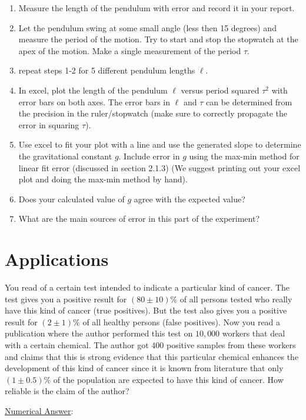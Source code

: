 \begin{itemize}
\begin{enumerate}
\item Measure the length of the pendulum with error and record it in your report.
\item Let the pendulum swing at some small angle (less then 15 degrees) and measure the period of the motion. Try to start and stop the stopwatch at the apex of the motion. Make a single measurement of the period $\tau$.
\item repeat steps 1-2 for 5 different pendulum lengths $\ell$.
\item In excel, plot the length of the pendulum $\ell$ versus period squared $\tau^2$ with error bars on both axes. The error bars in $\ell$ and $\tau$ can be determined from the precision in the ruler/stopwatch (make sure to correctly propagate the error in squaring $\tau$).
\item Use excel to fit your plot with a line and use the generated slope to determine the gravitational constant $g$. Include error in $g$ using the max-min method for linear fit error (discussed in section 2.1.3) (We suggest printing out your excel plot and doing the max-min method by hand).
\item Does your calculated value of $g$ agree with the expected value?
\item What are the main sources of error in this part of the experiment?
\end{enumerate}
\end{itemize}

\newpage
\section{Applications}
You read of a certain test intended to indicate a particular kind of cancer. The test gives you a positive result for $(80 \pm 10) \%$ of all persons tested who really have this kind of cancer (true positives). But the test also gives you a positive result for $(2 \pm 1) \%$ of all healthy persons (false positives). Now you read a publication where the author performed this test on $10,000$ workers that deal with a certain chemical. The author got 400 positive samples from these workers and claims that this is strong evidence that this particular chemical enhances the development of this kind of cancer since it is known from literature that only $(1 \pm 0.5)\%$ of the population are expected to have this kind of cancer. How reliable is the claim of the author?\myskip

\noindent \underline{Numerical Answer}:

